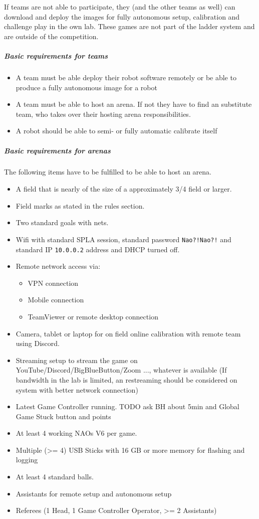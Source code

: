 If teams are not able to participate, they (and the other teams as well) can download and deploy the images for fully autonomous setup, calibration and challenge play in the own lab. These games are not part of the ladder system and are outside of the competition.

\subparagraph*{Basic requirements for teams}

\begin{itemize}
    \item A team must be able deploy their robot software remotely or be able to produce a fully autonomous image for a robot
    \item A team must be able to host an arena. If not they have to find an substitute team, who takes over their hosting arena responsibilities.
    \item A robot should be able to semi- or fully automatic calibrate itself
\end{itemize}

\subparagraph*{Basic requirements for arenas}

The following items have to be fulfilled to be able to host an arena.

\begin{itemize}
    \item A field that is nearly of the size of a approximately 3/4 field or larger.
    \item Field marks as stated in the rules section. 
    \item Two standard goals with nets.
    \item Wifi with standard SPL\textunderscore A session, standard password \texttt{Nao?!Nao?!} and standard IP \texttt{10.0.0.2} address and DHCP turned off.
    \item Remote network access via:
    \begin{itemize}
        \item VPN connection
        \item Mobile connection
        \item TeamViewer or remote desktop connection
    \end{itemize}
    \item Camera, tablet or laptop for on field online calibration with remote team using Discord.
    \item Streaming setup to stream the game on YouTube/Discord/BigBlueButton/Zoom ..., whatever is available (If bandwidth in the lab is limited, an restreaming should be considered on system with better network connection)
    \item Latest Game Controller running. TODO ask BH about 5min and Global Game Stuck button and points 
    \item At least 4 working NAOs V6 per game.
    \item Multiple (>= 4) USB Sticks with 16 GB or more memory for flashing and logging 
    \item At least 4 standard balls.
    \item Assistants for remote setup and autonomous setup
    \item Referees (1 Head, 1 Game Controller Operator, >= 2 Assistants)
\end{itemize}

